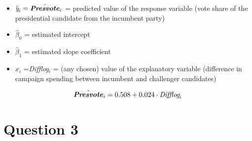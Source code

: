 \documentclass[12pt,letterpaper]{article}
\begin{document}
\begin{enumerate}
		\begin{flushleft}
			
		\begin{itemize}
			\item $\hat{\textit{y}}_i = \hat{\textbf{\textit{Presvote}}}_i$ = predicted value of the response variable (vote share of the presidential candidate from the incumbent party)
			\item $\hat{\beta}_0$ = estimated intercept
			\item $\hat{\beta}_1$ = estimated slope coefficient
			\item $x_i$  =\textit{Difflog}\(_i\) = (any chosen) value of the explanatory variable (difference in campaign spending between incumbent and challenger candidates)
		\end{itemize}
		
			
		\end{flushleft}
		\[\hat{\textbf{\textit{Presvote}}}_i  =  0.508 + 0.024\cdot  \textit{Difflog}_i
		\]
		
	\end{enumerate}
	
\section*{Question 3}
\end{document}
